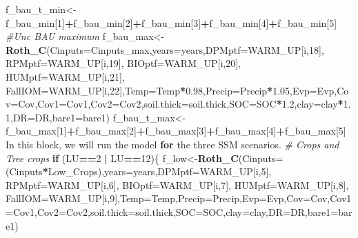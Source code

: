 \documentclass[
  10pt,
  b5paper,
]{book}
\newenvironment{Shaded}{\begin{snugshade}}{\end{snugshade}}
\newcommand{\CommentTok}[1]{\textcolor[rgb]{0.56,0.35,0.01}{\textit{#1}}}
\newcommand{\ControlFlowTok}[1]{\textcolor[rgb]{0.13,0.29,0.53}{\textbf{#1}}}
\newcommand{\DataTypeTok}[1]{\textcolor[rgb]{0.13,0.29,0.53}{#1}}
\newcommand{\DecValTok}[1]{\textcolor[rgb]{0.00,0.00,0.81}{#1}}
\newcommand{\FloatTok}[1]{\textcolor[rgb]{0.00,0.00,0.81}{#1}}
\newcommand{\KeywordTok}[1]{\textcolor[rgb]{0.13,0.29,0.53}{\textbf{#1}}}
\newcommand{\NormalTok}[1]{#1}
\newcommand{\OperatorTok}[1]{\textcolor[rgb]{0.81,0.36,0.00}{\textbf{#1}}}
\newcommand{\StringTok}[1]{\textcolor[rgb]{0.31,0.60,0.02}{#1}}
\begin{document}
\begin{Shaded}
\begin{Highlighting}[]
\NormalTok{f_bau_t_min<-f_bau_min[}\DecValTok{1}\NormalTok{]}\OperatorTok{+}\NormalTok{f_bau_min[}\DecValTok{2}\NormalTok{]}\OperatorTok{+}\NormalTok{f_bau_min[}\DecValTok{3}\NormalTok{]}\OperatorTok{+}\NormalTok{f_bau_min[}\DecValTok{4}\NormalTok{]}\OperatorTok{+}\NormalTok{f_bau_min[}\DecValTok{5}\NormalTok{]}
\CommentTok{#Unc BAU maximum}
\NormalTok{f_bau_max<-}\KeywordTok{Roth_C}\NormalTok{(}\DataTypeTok{Cinputs=}\NormalTok{Cinputs_max,}\DataTypeTok{years=}\NormalTok{years,}\DataTypeTok{DPMptf=}\NormalTok{WARM_UP[i,}\DecValTok{18}\NormalTok{], }\DataTypeTok{RPMptf=}\NormalTok{WARM_UP[i,}\DecValTok{19}\NormalTok{], }\DataTypeTok{BIOptf=}\NormalTok{WARM_UP[i,}\DecValTok{20}\NormalTok{], }\DataTypeTok{HUMptf=}\NormalTok{WARM_UP[i,}\DecValTok{21}\NormalTok{], }\DataTypeTok{FallIOM=}\NormalTok{WARM_UP[i,}\DecValTok{22}\NormalTok{],}\DataTypeTok{Temp=}\NormalTok{Temp}\OperatorTok{*}\FloatTok{0.98}\NormalTok{,}\DataTypeTok{Precip=}\NormalTok{Precip}\OperatorTok{*}\FloatTok{1.05}\NormalTok{,}\DataTypeTok{Evp=}\NormalTok{Evp,}\DataTypeTok{Cov=}\NormalTok{Cov,}\DataTypeTok{Cov1=}\NormalTok{Cov1,}\DataTypeTok{Cov2=}\NormalTok{Cov2,}\DataTypeTok{soil.thick=}\NormalTok{soil.thick,}\DataTypeTok{SOC=}\NormalTok{SOC}\OperatorTok{*}\FloatTok{1.2}\NormalTok{,}\DataTypeTok{clay=}\NormalTok{clay}\OperatorTok{*}\FloatTok{1.1}\NormalTok{,}\DataTypeTok{DR=}\NormalTok{DR,}\DataTypeTok{bare1=}\NormalTok{bare1)}
\NormalTok{f_bau_t_max<-f_bau_max[}\DecValTok{1}\NormalTok{]}\OperatorTok{+}\NormalTok{f_bau_max[}\DecValTok{2}\NormalTok{]}\OperatorTok{+}\NormalTok{f_bau_max[}\DecValTok{3}\NormalTok{]}\OperatorTok{+}\NormalTok{f_bau_max[}\DecValTok{4}\NormalTok{]}\OperatorTok{+}\NormalTok{f_bau_max[}\DecValTok{5}\NormalTok{]}
\NormalTok{In this block, we will run the model }\ControlFlowTok{for}\NormalTok{ the three SSM scenarios. }
\CommentTok{# Crops and Tree crops}
\ControlFlowTok{if}\NormalTok{ (LU}\OperatorTok{==}\DecValTok{2} \OperatorTok{|}\StringTok{ }\NormalTok{LU}\OperatorTok{==}\DecValTok{12}\NormalTok{)\{}
\NormalTok{f_low<-}\KeywordTok{Roth_C}\NormalTok{(}\DataTypeTok{Cinputs=}\NormalTok{(Cinputs}\OperatorTok{*}\NormalTok{Low_Crops),}\DataTypeTok{years=}\NormalTok{years,}\DataTypeTok{DPMptf=}\NormalTok{WARM_UP[i,}\DecValTok{5}\NormalTok{], }\DataTypeTok{RPMptf=}\NormalTok{WARM_UP[i,}\DecValTok{6}\NormalTok{], }\DataTypeTok{BIOptf=}\NormalTok{WARM_UP[i,}\DecValTok{7}\NormalTok{], }\DataTypeTok{HUMptf=}\NormalTok{WARM_UP[i,}\DecValTok{8}\NormalTok{], }\DataTypeTok{FallIOM=}\NormalTok{WARM_UP[i,}\DecValTok{9}\NormalTok{],}\DataTypeTok{Temp=}\NormalTok{Temp,}\DataTypeTok{Precip=}\NormalTok{Precip,}\DataTypeTok{Evp=}\NormalTok{Evp,}\DataTypeTok{Cov=}\NormalTok{Cov,}\DataTypeTok{Cov1=}\NormalTok{Cov1,}\DataTypeTok{Cov2=}\NormalTok{Cov2,}\DataTypeTok{soil.thick=}\NormalTok{soil.thick,}\DataTypeTok{SOC=}\NormalTok{SOC,}\DataTypeTok{clay=}\NormalTok{clay,}\DataTypeTok{DR=}\NormalTok{DR,}\DataTypeTok{bare1=}\NormalTok{bare1)}

\end{Highlighting}
\end{Shaded}
\end{document}
